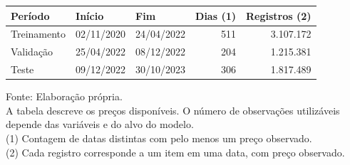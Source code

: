 \begingroup
\setlength{}
\setlength{}
\fontsize{12.0pt}{14.4pt}\selectfont

\setlength{\LTpost}{0mm}
\begin{longtable}{@{\extracolsep{\fill}}lllrr}

\toprule
\textbf{Período} & \textbf{Início} & \textbf{Fim} & \textbf{Dias} (1) & \textbf{Registros} (2) \\ 
\midrule\addlinespace[2.5pt]
Treinamento & 02/11/2020 & 24/04/2022 & 511 & 3.107.172 \\
Validação & 25/04/2022 & 08/12/2022 & 204 & 1.215.381 \\
Teste & 09/12/2022 & 30/10/2023 & 306 & 1.817.489 \\
\bottomrule
\end{longtable}
\begin{minipage}{\linewidth}
Fonte: Elaboração própria.\\
A tabela descreve os preços disponíveis. O número de observações utilizáveis depende das variáveis e do alvo do modelo.\\
(1) Contagem de datas distintas com pelo menos um preço observado.\\
(2) Cada registro corresponde a um item em uma data, com preço observado.\\
\end{minipage}
\endgroup

